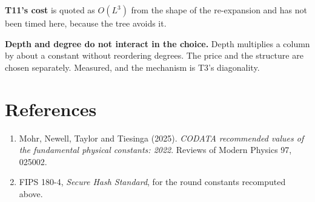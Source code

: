 \textbf{T11's cost} is quoted as \(O(L^3)\) from the shape of the re-expansion and has not been timed here, because the tree avoids it.

\textbf{Depth and degree do not interact in the choice.} Depth multiplies a column by about a constant without reordering degrees. The price and the structure are chosen separately. Measured, and the mechanism is T3's diagonality.

\section{References}

\begin{enumerate}
  \item Mohr, Newell, Taylor and Tiesinga (2025). \emph{CODATA recommended values of the fundamental physical constants: 2022}. Reviews of Modern Physics 97, 025002.
  \item FIPS 180-4, \emph{Secure Hash Standard}, for the round constants recomputed above.
\end{enumerate}
